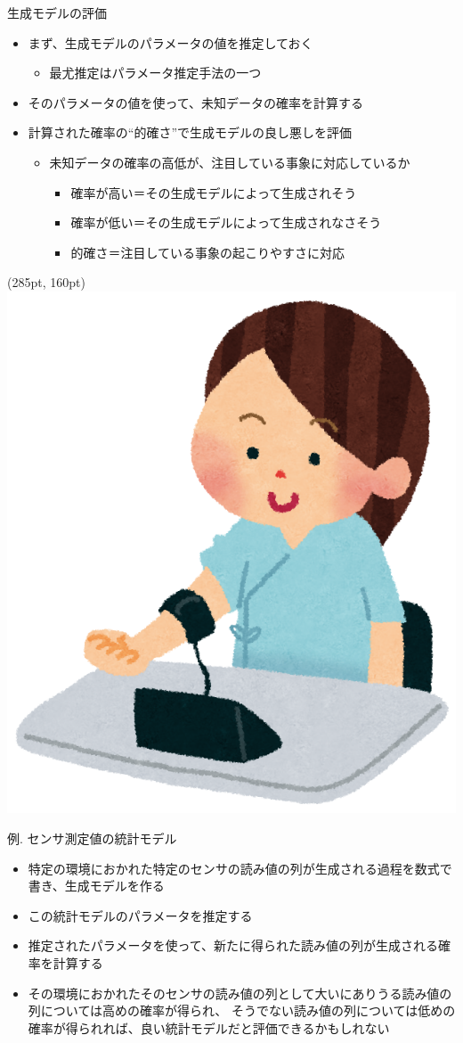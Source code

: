 \documentclass[aspectratio=169,unicode,dvipdfmx,14pt]{beamer}
\begin{document}
\begin{frame}{生成モデルの評価}
\begin{itemize}
\item まず、生成モデルのパラメータの値を推定しておく
\begin{itemize}
\item 最尤推定はパラメータ推定手法の一つ
\end{itemize}
\item そのパラメータの値を使って、未知データの確率を計算する
\item 計算された確率の``的確さ''で生成モデルの良し悪しを評価
\begin{itemize}
\item 未知データの確率の高低が、注目している事象に対応しているか
\begin{itemize}
\item 確率が高い＝その生成モデルによって生成されそう
\item 確率が低い＝その生成モデルによって生成されなさそう
\item 的確さ＝注目している事象の起こりやすさに対応
\end{itemize}
\end{itemize}
\end{itemize}
\begin{textblock*}{0.4\linewidth}(285pt, 160pt)
    \centering
    \includegraphics[width=0.5\linewidth]{kenkoushindan_ketsuatsu}
\end{textblock*}

\end{frame}

\begin{frame}{例. センサ測定値の統計モデル}
\begin{itemize}
\item 特定の環境におかれた特定のセンサの読み値の列が生成される過程を数式で書き、生成モデルを作る
\item この統計モデルのパラメータを推定する
\item 推定されたパラメータを使って、新たに得られた読み値の列が生成される確率を計算する
\item その環境におかれたそのセンサの読み値の列として大いにありうる読み値の列については高めの確率が得られ、
そうでない読み値の列については低めの確率が得られれば、良い統計モデルだと評価できるかもしれない
\end{itemize}
\end{frame}
\end{document}
